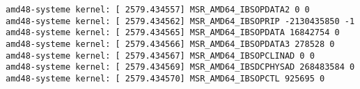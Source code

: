 \begin{verbatim}
amd48-systeme kernel: [ 2579.434557] MSR_AMD64_IBSOPDATA2 0 0
amd48-systeme kernel: [ 2579.434562] MSR_AMD64_IBSOPRIP -2130435850 -1
amd48-systeme kernel: [ 2579.434565] MSR_AMD64_IBSOPDATA 16842754 0
amd48-systeme kernel: [ 2579.434566] MSR_AMD64_IBSOPDATA3 278528 0
amd48-systeme kernel: [ 2579.434567] MSR_AMD64_IBSOPCLINAD 0 0
amd48-systeme kernel: [ 2579.434569] MSR_AMD64_IBSDCPHYSAD 268483584 0
amd48-systeme kernel: [ 2579.434570] MSR_AMD64_IBSOPCTL 925695 0

    \end{verbatim}
